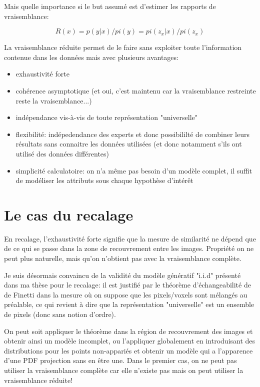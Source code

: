\documentclass{article}
\begin{document}
Mais quelle importance si le but assum\'e est d'estimer les rapports de vraisemblance: 

$$R(x) = p(y|x) / pi(y) = pi(z_x|x) / pi(z_x)$$ 

La vraisemblance r\'eduite permet de le faire sans exploiter toute l'information contenue dans les donn\'ees mais avec plusieurs avantages: 

\begin{itemize}
\item exhaustivit\'e forte 
\item coh\'erence asymptotique (et oui, c'est maintenu car la vraisemblance   restreinte reste la vraisemblance...) 
\item ind\'ependance vis-\`a-vis de toute repr\'esentation "universelle" 
\item flexibilit\'e: ind\'epedendance des experts et donc possibililt\'e de   combiner leurs r\'esultats sans connaitre les donn\'ees utilis\'ees (et   donc notamment s'ils ont utilis\'e des donn\'ees diff\'erentes) 
\item simplicit\'e calculatoire: on n'a m\^eme pas besoin d'un mod\`ele complet,   il suffit de mod\'eliser les attributs sous chaque hypoth\`ese d'int\'er\^et 
\end{itemize}

\section{Le cas du recalage}

En recalage, l'exhaustivit\'e forte signifie que la mesure de similarit\'e ne d\'epend que de ce qui se passe dans la zone de recouvrement entre les images. Propri\'et\'e on ne peut plus naturelle, mais qu'on n'obtient pas avec la vraisemblance compl\`ete. 

Je suis d\'esormais convaincu de la validit\'e du mod\`ele g\'en\'eratif "i.i.d" pr\'esent\'e dans ma th\`ese pour le recalage: il est justifi\'e par le th\'eor\`eme d'\'echangeabilit\'e de de Finetti dans la mesure o\`u on suppose que les pixels/voxels sont m\'elang\'es au pr\'ealable, ce qui revient \`a dire que la repr\'esentation "universelle" est un ensemble de pixels (donc sans notion d'ordre). 

On peut soit appliquer le th\'eor\`eme dans la r\'egion de recouvrement des images et obtenir ainsi un mod\`ele incomplet, ou l'appliquer globalement en introduisant des distributions pour les points non-appari\'es et obtenir un mod\`ele qui a l'apparence d'une PDF projection sans en \^etre une. Dans le premier cas, on ne peut pas utiliser la vraisemblance compl\`ete car elle n'existe pas mais on peut utiliser la vraisemblance r\'eduite! 
\end{document}
